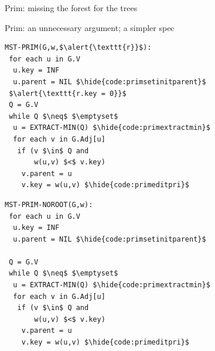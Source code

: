 \documentclass[usenames, xcolor=dvipsnames]{beamer}
\newcommand{\hide}[1]{}
\begin{document}
\begin{frame}[fragile]{Prim: missing the forest for the trees}
\begin{minipage}{0.35\textwidth}
{{\begin{adjustbox}{scale=0.9}
\end{adjustbox}

}}
\end{minipage}

\end{frame}


\begin{frame}[fragile]{Prim: an unnecessary argument; a simpler spec}

\begin{minipage}{0.48\textwidth}
\begin{lstlisting}
MST-PRIM(G,w,$\alert{\texttt{r}}$):
 for each u in G.V
  u.key = INF
  u.parent = NIL $\hide{code:primsetinitparent}$
 $\alert{\texttt{r.key = 0}}$
 Q = G.V
 while Q $\neq$ $\emptyset$
  u = EXTRACT-MIN(Q) $\hide{code:primextractmin}$
  for each v in G.Adj[u]
   if (v $\in$ Q and 
       w(u,v) $<$ v.key)
    v.parent = u
    v.key = w(u,v) $\hide{code:primeditpri}$
\end{lstlisting} \end{minipage}
\begin{minipage}{0.5\textwidth}
\begin{lstlisting}
MST-PRIM-NOROOT(G,w):
 for each u in G.V
  u.key = INF
  u.parent = NIL $\hide{code:primsetinitparent}$

 Q = G.V
 while Q $\neq$ $\emptyset$
  u = EXTRACT-MIN(Q) $\hide{code:primextractmin}$
  for each v in G.Adj[u]
   if (v $\in$ Q and 
       w(u,v) $<$ v.key)
    v.parent = u
    v.key = w(u,v) $\hide{code:primeditpri}$
\end{lstlisting} 
\end{minipage} 
\end{frame}
\end{document}
